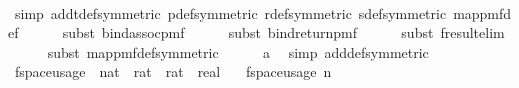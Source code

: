 \begin{isabellebody}
\ \ \ \ \isamarkupfalse%
\ {\isacharparenleft}{\kern0pt}simp\ add{\isacharcolon}{\kern0pt}t{\isacharunderscore}{\kern0pt}def{\isacharbrackleft}{\kern0pt}symmetric{\isacharbrackright}{\kern0pt}\ p{\isacharunderscore}{\kern0pt}def{\isacharbrackleft}{\kern0pt}symmetric{\isacharbrackright}{\kern0pt}\ r{\isacharunderscore}{\kern0pt}def{\isacharbrackleft}{\kern0pt}symmetric{\isacharbrackright}{\kern0pt}\ s{\isacharunderscore}{\kern0pt}def{\isacharbrackleft}{\kern0pt}symmetric{\isacharbrackright}{\kern0pt}\ map{\isacharunderscore}{\kern0pt}pmf{\isacharunderscore}{\kern0pt}def{\isacharparenright}{\kern0pt}\isanewline
\ \ \ \ \isamarkupfalse%
\ {\isacharparenleft}{\kern0pt}subst\ bind{\isacharunderscore}{\kern0pt}assoc{\isacharunderscore}{\kern0pt}pmf{\isacharparenright}{\kern0pt}\isanewline
\ \ \ \ \isamarkupfalse%
\ {\isacharparenleft}{\kern0pt}subst\ bind{\isacharunderscore}{\kern0pt}return{\isacharunderscore}{\kern0pt}pmf{\isacharparenright}{\kern0pt}\isanewline
\ \ \ \ \isamarkupfalse%
\ {\isacharparenleft}{\kern0pt}subst\ f{}{\isacharunderscore}{\kern0pt}result{\isacharunderscore}{\kern0pt}elim{\isacharparenright}{\kern0pt}\isanewline
\ \ \ \ \isamarkupfalse%
\ {\isacharparenleft}{\kern0pt}subst\ map{\isacharunderscore}{\kern0pt}pmf{\isacharunderscore}{\kern0pt}def{\isacharbrackleft}{\kern0pt}symmetric{\isacharbrackright}{\kern0pt}{\isacharparenright}{\kern0pt}\isanewline
\ \ \ \ \isamarkupfalse%
\ a\ \isamarkupfalse%
\ {\isacharparenleft}{\kern0pt}simp\ add{\isacharcolon}{\kern0pt}{\isasymOmega}def{\isacharbrackleft}{\kern0pt}symmetric{\isacharbrackright}{\kern0pt}{\isacharparenright}{\kern0pt}\isanewline
{}\isamarkupfalse%
%
\endisatagproof
{\isafoldproof}%
%
\isadelimproof
\isanewline
%
\endisadelimproof
\isanewline
{}\isamarkupfalse%
\ f{}{\isacharunderscore}{\kern0pt}space{\isacharunderscore}{\kern0pt}usage\ {\isacharcolon}{\kern0pt}{\isacharcolon}{\kern0pt}\ {\isachardoublequoteopen}{\isacharparenleft}{\kern0pt}nat\ {\isasymtimes}\ rat\ {\isasymtimes}\ rat{\isacharparenright}{\kern0pt}\ {\isasymRightarrow}\ real{\isachardoublequoteclose}\ \isanewline
\ \ {\isachardoublequoteopen}f{}{\isacharunderscore}{\kern0pt}space{\isacharunderscore}{\kern0pt}usage\ {\isacharparenleft}{\kern0pt}n{\isacharcomma}{\kern0pt}\ {\isasymepsilon}{\isacharcomma}{\kern0pt}\ {\isasymdelta}{\isacharparenright}{\kern0pt}\ {\isacharequal}{\kern0pt}\ {\isacharparenleft}{\kern0pt}\isanewline

\end{isabellebody}
